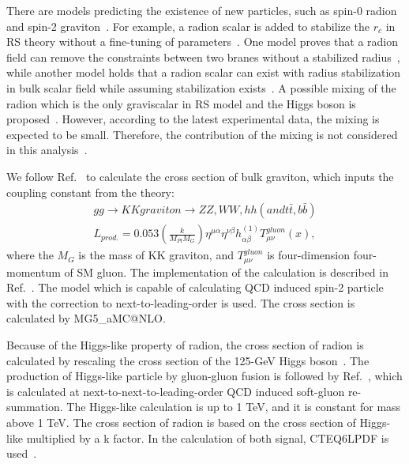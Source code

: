 There are models predicting the existence of new particles, such as spin-0 radion and spin-2 graviton~\citep{Davoudiasl:1999jd,Agashe:2007zd,Fitzpatrick:2007qr}. For example, a radion scalar is added to stabilize the $r_c$ in RS theory without a fine-tuning of parameters~\citep{Goldberger:1999uk}. One model proves that
a radion field can remove the constraints between two branes without a stabilized radius~\citep{Csaki:1999mp}, while another model holds that 
a radion scalar can exist with radius stabilization in bulk scalar field while assuming stabilization exists~\citep{Csaki:2000zn}.
A possible mixing of the radion which is the only graviscalar in RS model and the Higgs boson is proposed~\citep{Giudice:2000av}.
However, according to the latest experimental data, the mixing is expected to be small. Therefore, the contribution of the mixing is not considered in this analysis~\citep{Desai:2013pga}.

We follow Ref.~\citep{Agashe:2013kyb} to calculate the cross section of bulk graviton, which inputs the coupling constant from the theory: 
\begin{equation} 
\begin{split}
gg \rightarrow KK graviton \rightarrow ZZ, WW, hh (and t\bar{t}, b\bar{b}) \\
\textit{L}_{prod.} = 0.053 (\frac{k}{M_{Pl}M_{G}})\eta^{\mu\alpha}\eta^{\nu\beta}h^{(1)}_{\alpha\beta}T^{gluon}_{\mu \nu}(x), 
\end{split}
\end{equation}
where the $M_G$ is the mass of KK graviton, and $T^{gluon}_{\mu \nu}$ is four-dimension four-momentum of SM gluon. The implementation of the calculation is described in Ref.~\citep{Oliveira:2014kla}. The model which is capable of calculating QCD induced spin-2 particle with the correction to next-to-leading-order is used. The cross section is calculated by \textsf{MG5\_aMC@NLO}.

Because of the Higgs-like property of radion, the cross section of radion is calculated by rescaling the cross section of the 125-GeV Higgs boson~\citep{Agashe:2013kyb,AN-16-300}. The production of Higgs-like particle by gluon-gluon fusion is followed by Ref.~\citep{Catani:2003zt,Heinemeyer:2013tqa}, which is calculated at next-to-next-to-leading-order QCD induced soft-gluon re-summation. The Higgs-like calculation is up to 1 TeV, and it is constant for mass above 1 TeV. The cross section of radion is based on the cross section of Higgs-like multiplied by a k factor. 
In the calculation of both signal, CTEQ6LPDF is used~\citep{Nadolsky:2008zw}.  

